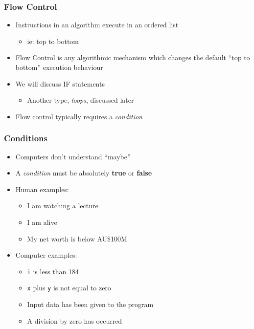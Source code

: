 \documentclass[14pt]{beamer}
\begin{document}
\begin{frame}
\frametitle{Flow Control}
\begin{itemize}
\item Instructions in an algorithm execute in an ordered list
	\begin{itemize}
		\item ie: top to bottom
	\end{itemize}
\item Flow Control is any algorithmic mechanism which changes the default ``top to bottom'' execution behaviour
\item We will discuss IF statements
	\begin{itemize}
		\item Another type, \textit{loops}, discussed later
	\end{itemize}	
\item Flow control typically requires a \textit{condition}
\end{itemize}
\end{frame}

\begin{frame}
\frametitle{Conditions}
\begin{itemize}
\item Computers don't understand ``maybe''
\item A \textit{condition} must be absolutely \textbf{true} or \textbf{false}
\item Human examples:
	\begin{itemize}
		\item I am watching a lecture
		\item I am alive
		\item My net worth is below AU\$100M
	\end{itemize}
\item Computer examples:
	\begin{itemize}
		\item \texttt{i} is less than 184
		\item \texttt{x} plus \texttt{y} is not equal to zero
		\item Input data has been given to the program
		\item A division by zero has occurred
	\end{itemize}
\end{itemize}
\end{frame}
\end{document}
